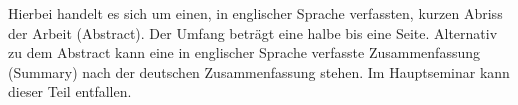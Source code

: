 
Hierbei handelt es sich um einen, in englischer Sprache verfassten, kurzen Abriss der
Arbeit (Abstract). Der Umfang beträgt eine halbe bis eine Seite. Alternativ zu dem
Abstract kann eine in englischer Sprache verfasste Zusammenfassung (Summary) nach
der deutschen Zusammenfassung stehen. Im Hauptseminar kann dieser Teil entfallen.